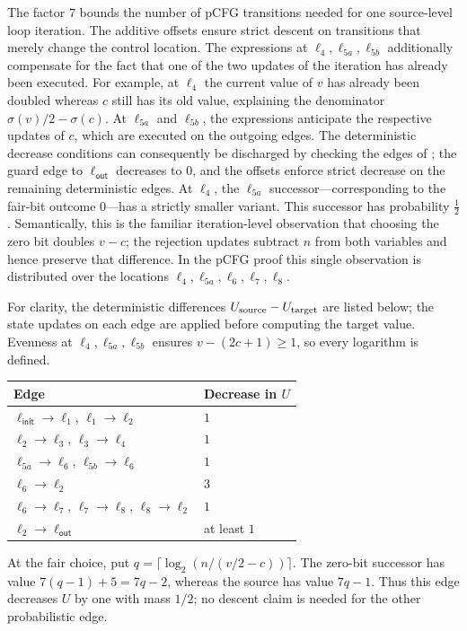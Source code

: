 The factor $7$ bounds the number of pCFG transitions needed for one source-level
loop iteration.  The additive offsets ensure strict descent on transitions
that merely change the control location.  The expressions at
$\ell_4,\ell_{5a},\ell_{5b}$ additionally compensate for the fact that one of
the two updates of the iteration has already been executed.  For example,
at $\ell_4$ the current value of $v$ has already been doubled whereas $c$
still has its old value, explaining the denominator
$\sigma(v)/2-\sigma(c)$.  At $\ell_{5a}$ and $\ell_{5b}$, the expressions anticipate the
respective updates of $c$, which are executed on the outgoing edges.
The deterministic decrease conditions can consequently be discharged by
checking the edges of ; the guard edge to
$\ell_{\mathsf{out}}$ decreases to $0$, and the offsets enforce strict
decrease on the remaining deterministic edges.  At $\ell_4$, the
$\ell_{5a}$ successor---corresponding to the fair-bit outcome $0$---has a
strictly smaller variant.  This successor has probability $\frac12$.
Semantically, this is the familiar iteration-level observation that choosing
the zero bit doubles $v-c$; the rejection updates subtract $n$ from both
variables and hence preserve that difference.  In the pCFG proof this single
observation is distributed over the locations
$\ell_4,\ell_{5a},\ell_6,\ell_7,\ell_8$.

For clarity, the deterministic differences $U_{\rm source}-U_{\rm target}$
are listed below; the state updates on each edge are applied before
computing the target value. Evenness at $\ell_4,\ell_{5a},\ell_{5b}$
ensures $v-(2c+1)\geq1$, so every logarithm is defined.
\begin{center}
\begin{tabular}{@{}ll@{}}
\toprule
Edge & Decrease in $U$\\
\midrule
$\ell_{\mathsf{init}}\to\ell_1$, $\ell_1\to\ell_2$ & $1$\\
$\ell_2\to\ell_3$, $\ell_3\to\ell_4$ & $1$\\
$\ell_{5a}\to\ell_6$, $\ell_{5b}\to\ell_6$ & $1$\\
$\ell_6\to\ell_2$ & $3$\\
$\ell_6\to\ell_7$, $\ell_7\to\ell_8$, $\ell_8\to\ell_2$ & $1$\\
$\ell_2\to\ell_{\mathsf{out}}$ & at least $1$\\
\bottomrule
\end{tabular}
\end{center}
At the fair choice, put
$q=\lceil\log_2(n/(v/2-c))\rceil$.
The zero-bit successor has value $7(q-1)+5=7q-2$, whereas the source
has value $7q-1$. Thus this edge decreases $U$ by one with mass $1/2$;
no descent claim is needed for the other probabilistic edge.

